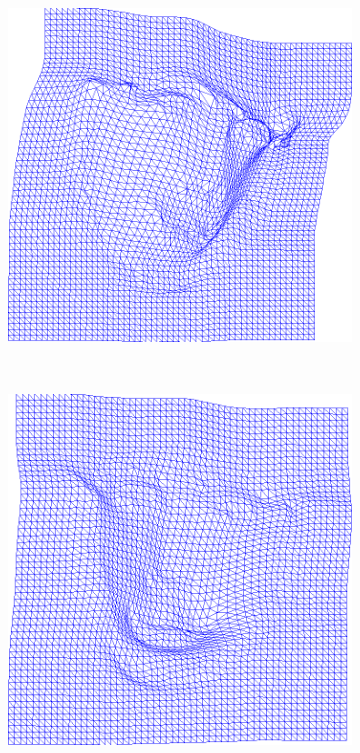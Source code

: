 \begin{figure}[t!]
\begin{subfigure}[b]{0.15\textwidth}
    \end{subfigure}
   	\hfill
    \begin{subfigure}[b]{0.15\textwidth}
            \includegraphics[width=\textwidth]{resources/Fig_Flows/2}
    \end{subfigure}
    \\
    \begin{subfigure}[b]{0.15\textwidth}
            \includegraphics[width=\textwidth]{resources/Fig_Flows/3}

\end{subfigure}
\end{figure}
